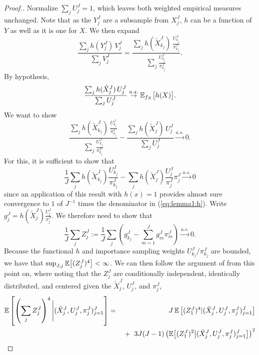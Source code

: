 \documentclass[11pt]{article}
\theoremstyle{thmstylethree}%
\begin{document}
\begin{proof}[Proof.]
    Normalize $\sum_j U_j^J=1$, which leaves both weighted empirical measures unchanged.
    Note that as the $Y_j^J$ are a subsample from $X_j^J$, $h$ can be a function of $Y$ as well as it is one for $X$. We then expand
    \begin{equation}\frac{\sum_j h(Y_j^J) \, V_j^J}{\sum_j V_j^J} = \frac{\sum_j h(\tilde X_{k_j}^J)\, \frac{U_{k_j}^J}{\pi_{k_j}^J}}{\sum_j \frac{U_{k_j}^J}{\pi_{k_j}^J}}.\end{equation}
    By hypothesis,
    \begin{equation}
    \frac{\sum_j h(\tilde X_j^J)\, U_j^J}{\sum_j U_j^J} \stackrel{a.s.}{\to} \mathbb{E}_{f_X}\big[h(X)\big].
    \end{equation}
    We want to show
    \begin{equation}\label{eq:lemma1:h}
    \frac{\sum_j h(\tilde X_{k_j}^J)\, \frac{U_{k_j}^J}{\pi_{k_j}^J}}{\sum_j \frac{U_{k_j}^J}{\pi_{k_j}^J}} - \frac{\sum_j h(\tilde X_j^J)\, U_j^J}{\sum_j U_j^J} \stackrel{a.s.}{\to} 0.
    \end{equation}
    For this, it is sufficient to show that
   \begin{equation} 
   \frac1J\sum_j h(\tilde X_{k_j}^J)\frac{U_{k_j}^J}{\pi_{k_j}^J}
    -  \sum_j h(\tilde X_j^J)\frac{U_j^J}{\pi_j^J}\pi_j^J \stackrel{a.s.}{\to} 0 
    \end{equation}
    since an application of this result with $h(x)=1$ provides almost sure convergence to $1$ of $J^{-1}$ times the denominator in (\ref{eq:lemma1:h}).
    Write $g_j^J = h(\tilde X_j^J)\frac{U_{j}^J}{\pi_{j}^J}$. We therefore need to show that
    \begin{equation}
    \frac1J\sum_j Z_j^J := \frac1J\sum_j \left(g_{k_j}^J - \sum_{m=1}^J g_m^J\pi_m^J \right) \stackrel{a.s.}{\to} 0.
\end{equation}
    Because the functional $h$ and importance sampling weights $U_{k_j}^J/\pi_{k_j}^J$ are bounded, we have that $\sup_{J,j}\mathbb{E}\big[(Z_j^J)^4\big] < \infty$. We can then follow the argument of \cite{chopin20} from this point on, where noting that the $Z_j^J$ are conditionally independent, identically distributed, and centered given the $\tilde{X}_j^J$, $U_j^J$, and $\pi_j^J$,
    \begin{eqnarray} 
    \E\left[\left(\sum_j Z_j^J\right)^4 \Bigg| (\tilde X_j^J,U_j^J,\pi_j^J)_{j=1}^J \right]
    &=& J\, \E\left[(Z_1^J)^4|(\tilde X_j^J,U_j^J,\pi_j^J)_{j=1}^J\right]
    \nonumber
    \\
    && \hspace{1mm}+ \hspace{2mm} 3J(J-1)\left(\E\big[(Z_{1}^J)^2\big|(\tilde X_j^J,U_j^J,\pi_j^J)_{j=1}^J\big]\right)^{2}

\end{eqnarray}
\end{proof}
\end{document}
